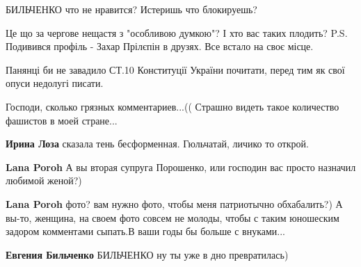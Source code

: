 \begin{itemize}
БИЛЬЧЕНКО что не нравится? Истеришь что блокируешь?


Це що за чергове нещастя з "особливою думкою"? І хто вас таких плодить? P.S. Подивився профіль - Захар Прілєпін в друзях. Все встало на своє місце.


Панянці би не завадило СТ.10 Конституції України почитати, перед тим як свої опуси недолугі писати.


Господи, сколько грязных комментариев...(( Страшно видеть такое количество фашистов в моей стране...

\begin{itemize}

\textbf{Ирина Лоза} сказала тень бесформенная. Гюльчатай, личико то открой.


\textbf{Lana Poroh} А вы вторая супруга Порошенко, или господин вас просто назначил любимой женой?)


\textbf{Lana Poroh} фото? вам нужно фото, чтобы меня патриотычно обхабалить?) А вы-то, женщина, на своем фото совсем не молоды, чтобы с таким юношеским задором комментами сыпать.\Smiley[1.0][yellow] В ваши годы бы больше с внуками...


\textbf{Евгения Бильченко} БИЛЬЧЕНКО ну ты уже в дно превратилась)



\end{itemize}
\end{itemize}
